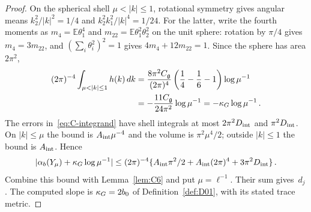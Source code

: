\begin{proof}
On the spherical shell $\mu<|k|\le1$, rotational symmetry gives angular means $k_2^2/|k|^2=1/4$ and $k_2^2k_1^2/|k|^4=1/24$. For the latter, write the fourth moments as $m_4=\mathbb E\theta_1^4$ and $m_{22}=\mathbb E\theta_1^2\theta_2^2$ on the unit sphere: rotation by $\pi/4$ gives $m_4=3m_{22}$, and $(\sum_i\theta_i^2)^2=1$ gives $4m_4+12m_{22}=1$. Since the sphere has area $2\pi^2$,
\begin{align}\label{eq:C-slope}
(2\pi)^{-4}\int_{\mu<|k|\le1}h(k)\,dk
&=\frac{8\pi^2\casimir}{(2\pi)^4}\left(\frac14-\frac16-1\right)\log\mu^{-1}\\
&=-\frac{11\casimir}{24\pi^2}\log\mu^{-1}=-\slope\log\mu^{-1}\,.\notag
\end{align}
The errors in~\eqref{eq:C-integrand} have shell integrals at most $2\pi^2D_{\rm int}$ and $\pi^2D_{\rm int}$. On $|k|\le\mu$ the bound is $A_{\rm int}\mu^{-4}$ and the volume is $\pi^2\mu^4/2$; outside $|k|\le1$ the bound is $A_{\rm int}$. Hence
\begin{equation*}
|\alpha_b(Y_\mu)+\kappa_G\log\mu^{-1}|
\le(2\pi)^{-4}\{A_{\rm int}\pi^2/2+A_{\rm int}(2\pi)^4+3\pi^2D_{\rm int}\}\,.
\end{equation*}
Combine this bound with Lemma~\ref{lem:C6} and put $\mu=\ell^{-1}$. Their sum gives~$d_j$. The computed slope is $\kappa_G=2b_0$ of Definition~\ref{def:D01}, with its stated trace metric.
\end{proof}

